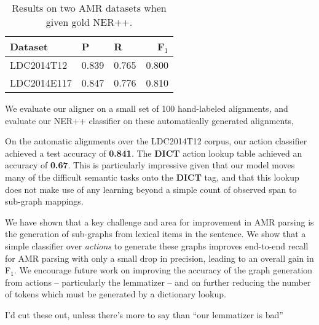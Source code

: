 \documentclass[11pt]{article}
\begin{document}
\begin{table}[t]
\begin{center}
\begin{tabular}{|l|ll:r|}
\hline Dataset & P & R & F$_1$ \\ \hline
LDC2014T12 & 0.839 & 0.765 & 0.800 \\
LDC2014E117 & 0.847 & 0.776 & 0.810 \\
\hline
\end{tabular}
\end{center}
\caption{\label{tab:goldner} 
Results on two AMR datasets when given gold NER++.
}
\end{table}


We evaluate our aligner on a small set of 100 hand-labeled alignments,
  and evaluate our NER++ classifier on these automatically generated alignments,

On the automatic alignments over the LDC2014T12 corpus,
  our action classifier achieved a test accuracy of \textbf{0.841}.
The \textbf{DICT} action lookup table achieved an accuracy of \textbf{0.67}.
This is particularly impressive given that our model moves many of the difficult 
  semantic tasks onto the \textbf{DICT} tag, and that this lookup does not make
  use of any learning beyond a simple count of observed span to sub-graph mappings.


We have shown that a key challenge and area for improvement in AMR parsing is the
  generation of sub-graphs from lexical items in the sentence.
We show that a simple classifier over \textit{actions} to generate
  these graphs improves end-to-end recall for AMR parsing with only a small
  drop in precision, leading to an overall gain in F$_1$.
We encourage future work on improving the accuracy of the graph generation from
  actions -- particularly the lemmatizer -- and on further reducing the number of
  tokens which must be generated by a dictionary lookup.


I'd cut these out, unless there's more to say than ``our lemmatizer is bad''
\end{document}
